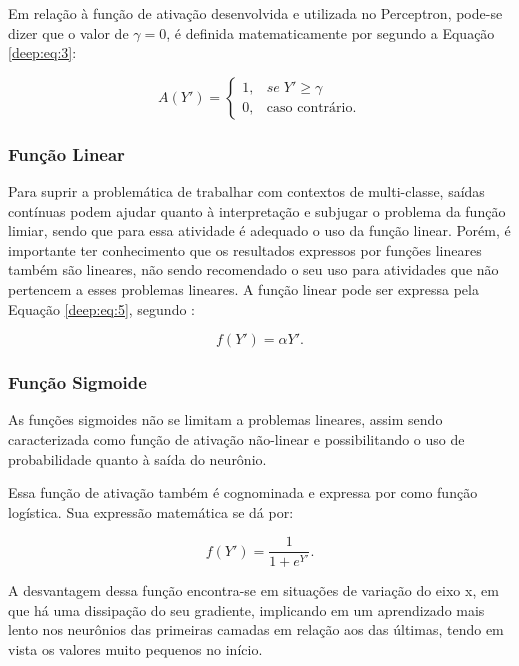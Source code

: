 Em relação à função de ativação desenvolvida e utilizada no Perceptron, pode-se dizer que o valor de $\gamma = 0$, é definida matematicamente por \cite{mcculloch1943logical} segundo a Equação \ref{deep:eq:3}:

\begin{equation}
    \label{deep:eq:3}
    A(Y') = \left\{\begin{matrix}
     1,& se \; Y' \geq \gamma \\ 
     0,& \text{caso contrário}.
    \end{matrix}\right.
\end{equation}


\subsubsection{Função Linear}
Para suprir a problemática de trabalhar com contextos de multi-classe, saídas contínuas podem ajudar quanto à interpretação e subjugar o problema da função limiar, sendo que para essa atividade é adequado o uso da função linear. Porém, é importante ter conhecimento que os resultados expressos por funções lineares também são lineares, não sendo recomendado o seu uso para atividades que não pertencem a esses problemas lineares. A função linear pode ser expressa pela Equação \ref{deep:eq:5}, segundo \cite{Rosenblatt1958}:

\begin{equation}
    \label{deep:eq:5}
    f(Y') = \alpha Y'.
\end{equation}


\subsubsection{Função Sigmoide}
As funções sigmoides não se limitam a problemas lineares, assim sendo caracterizada como função de ativação não-linear e possibilitando o uso de probabilidade quanto à saída do neurônio.

Essa função de ativação também é cognominada e expressa por \cite{glorot2011deep} como função logística. Sua expressão matemática se dá por:

\begin{equation}
    \label{deep:eq:6}
    f(Y') = \frac{1}{1 + e^{Y'}}.
\end{equation}

A desvantagem dessa função encontra-se em situações de variação do eixo x, em que há uma  dissipação do seu gradiente, implicando em um aprendizado mais lento nos neurônios das primeiras camadas em relação aos das últimas, tendo em vista os valores muito pequenos no início.


